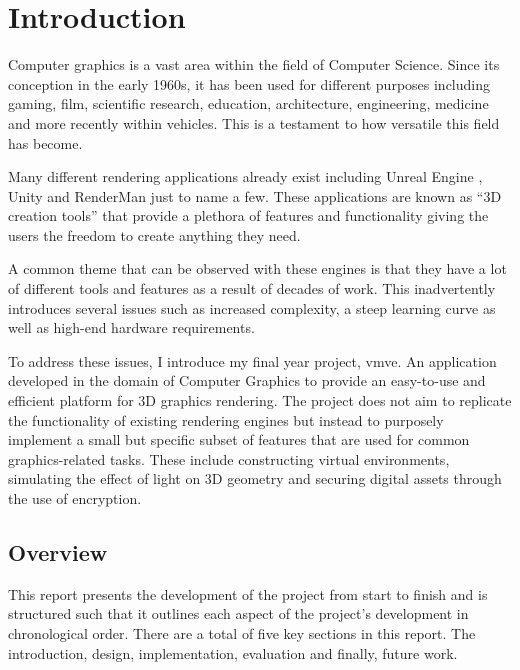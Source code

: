 \documentclass[11pt]{article}
\begin{document}
\section{Introduction}

Computer graphics is a vast area within the field of Computer Science. Since its
conception in the early 1960s, it has been used for different purposes including
gaming, film, scientific research, education, architecture, engineering,
medicine and more recently within vehicles. This is a testament to how versatile
this field has become.

Many different rendering applications already exist including Unreal Engine
\cite{unreal_engine}, Unity \cite{unity} and RenderMan \cite{render_man} just to
name a few. These applications are known as ``3D creation tools'' that provide a
plethora of features and functionality giving the users the freedom to create
anything they need.

A common theme that can be observed with these engines is that they have a lot
of different tools and features as a result of decades of work. This
inadvertently introduces several issues such as increased complexity, a steep
learning curve as well as high-end hardware requirements.

To address these issues, I introduce my final year project, \gls{vmve}. An
application developed in the domain of Computer Graphics to provide an
easy-to-use and efficient platform for 3D graphics rendering. The project does
not aim to replicate the functionality of existing rendering engines but instead
to purposely implement a small but specific subset of features that are used for
common graphics-related tasks. These include constructing virtual environments,
simulating the effect of light on 3D geometry and securing digital assets
through the use of encryption.



\subsection{Overview}
This report presents the development of the project from start to finish and is
structured such that it outlines each aspect of the project's development in
chronological order. There are a total of five key sections in this report. The
introduction, design, implementation, evaluation and finally, future work.
\end{document}
